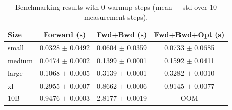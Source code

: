 \begin{table}
\caption{Benchmarking results with 0 warmup steps (mean $\pm$ std over 10 measurement steps).}
\label{tab:benchmarking_warmup0}
\begin{tabular}{lccc}
\toprule
Size & Forward (s) & Fwd+Bwd (s) & Fwd+Bwd+Opt (s) \\
\midrule
small & 0.0328 $\pm$ 0.0492 & 0.0604 $\pm$ 0.0359 & 0.0733 $\pm$ 0.0685 \\
medium & 0.0474 $\pm$ 0.0002 & 0.1399 $\pm$ 0.0001 & 0.1592 $\pm$ 0.0411 \\
large & 0.1068 $\pm$ 0.0005 & 0.3139 $\pm$ 0.0001 & 0.3282 $\pm$ 0.0010 \\
xl & 0.2955 $\pm$ 0.0007 & 0.8662 $\pm$ 0.0006 & 0.9145 $\pm$ 0.0077 \\
10B & 0.9476 $\pm$ 0.0003 & 2.8177 $\pm$ 0.0019 & OOM \\
\bottomrule
\end{tabular}
\end{table}
